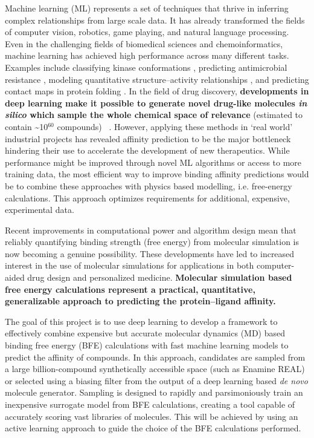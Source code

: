 Machine learning (ML) represents a set of techniques that thrive in inferring complex relationships from large scale data.
It has already transformed the fields of computer vision, robotics, game playing, and natural language processing.
Even in the challenging fields of biomedical sciences and chemoinformatics, machine learning has achieved high performance across many different tasks.
Examples include classifying kinase conformations \cite{mcskimming2017classifying}, predicting antimicrobial resistance \cite{davis2016antimicrobial}, modeling quantitative structure--activity relationships \cite{ma2015deep, gomes2017atomic}, and predicting contact maps in protein folding \cite{wang2017accurate}.
In the field of drug discovery, \textbf{developments in deep learning make it possible to generate novel drug-like molecules \textit{in silico} which sample the whole chemical space of relevance} (estimated to contain \textasciitilde10$^{60}$ compounds) ~\cite{schrodinger-active-learning, Segler2018:rnn}.
However, applying these methods in `real world' industrial projects has revealed affinity prediction to be the major bottleneck hindering their use to accelerate the development of new therapeutics.
While performance might be improved through novel ML algorithms or access to more training data, the most efficient way to improve binding affinity predictions would be to combine these approaches with physics based modelling, i.e. free-energy calculations. 
This approach optimizes requirements for additional, expensive, experimental data.

Recent improvements in computational power and algorithm design mean that reliably quantifying binding strength (free energy) from molecular simulation is now becoming a genuine possibility.
These developments have led to increased interest in the use of molecular simulations for applications in both computer-aided drug design and personalized medicine.
{\bf Molecular simulation based free energy calculations represent a practical, quantitative, generalizable approach to predicting the protein--ligand affinity.}

The goal of this project is to use deep learning to develop a framework to effectively combine expensive but accurate molecular dynamics (MD) based binding free energy (BFE) calculations with fast machine learning models to predict the affinity of compounds.
In this approach, candidates are sampled from a large billion-compound synthetically accessible space (such as Enamine REAL\cite{enamine-real}) or selected using a biasing filter from the output of a deep learning based \textit{de novo} molecule generator. 
Sampling is designed to rapidly and parsimoniously train an inexpensive surrogate model from BFE calculations, creating a tool capable of accurately scoring vast libraries of molecules.
This will be achieved by using an active learning approach to guide the choice of the BFE calculations performed.%